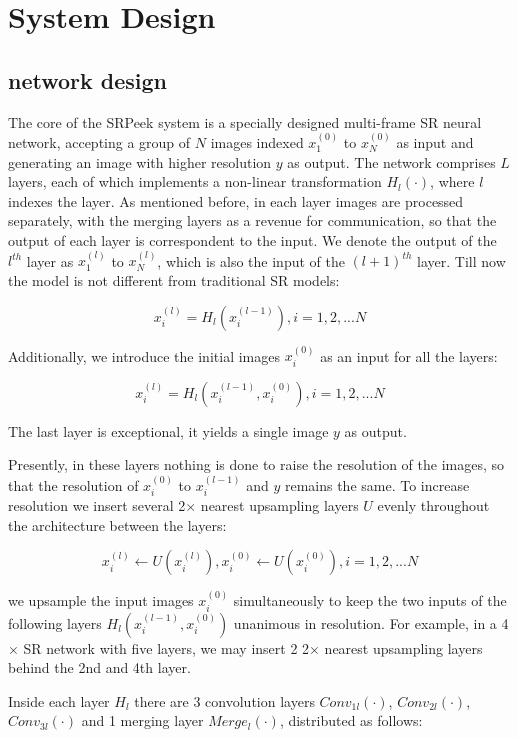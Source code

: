 \section{System Design}
\label{sec-design}

\subsection{network design}
The core of the \textsf{SRPeek} system is a specially designed multi-frame SR neural network, accepting a group of $N$ images indexed $x_1^{(0)}$ to $x_N^{(0)}$ as input and generating an image with higher resolution $y$ as output. The network comprises $L$ layers, each of which implements a non-linear transformation $H_l(\cdot)$, where $l$ indexes the layer. As mentioned before, in each layer images are processed separately, with the merging layers as a revenue for communication, so that the output of each layer is correspondent to the input.  We denote the output of the $l^{th}$ layer as $x_1^{(l)}$ to $x_N^{(l)}$, which is also the input of the $(l+1)^{th}$ layer. Till now the model is not different from traditional SR models:

$$x_i^{(l)} = H_l(x_i^{(l-1)}), i=1,2,...N$$


Additionally, we introduce the initial images $x_i^{(0)}$ as an input for all the layers:

$$x_i^{(l)} = H_l(x_i^{(l-1)},x_i^{(0)}), i=1,2,...N$$

The last layer is exceptional, it yields a single image $y$ as output. 

Presently, in these layers nothing is done to raise the resolution of the images, so that the resolution of $x_i^{(0)}$ to $x_i^{(l-1)}$ and $y$ remains the same. To increase resolution we insert several 2$\times$ nearest upsampling layers $U$ evenly throughout the architecture between the layers:

$$x_i^{(l)} \leftarrow U(x_i^{(l)}), x_i^{(0)} \leftarrow U(x_i^{(0)}), i=1,2,...N$$

we upsample the input images $x_i^{(0)}$ simultaneously to keep the two inputs of the following layers $H_l(x_i^{(l-1)},x_i^{(0)})$ unanimous in resolution. For example, in a 4$\times$ SR network with five layers, we may insert 2 2$\times$ nearest upsampling layers behind the 2nd and 4th layer.

Inside each layer $H_l$ there are 3 convolution layers $Conv_{1l}(\cdot)$, $Conv_{2l}(\cdot)$, $Conv_{3l}(\cdot)$ and 1 merging layer $Merge_l(\cdot)$, distributed as follows:

